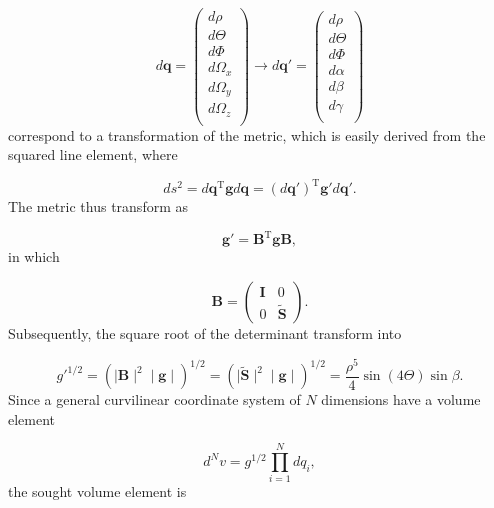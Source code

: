 \begin{equation}
d\mathbf{q} =
\begin{pmatrix}
d\rho\\
d\Theta\\
d\Phi\\
d\Omega_x\\
d\Omega_y\\
d\Omega_z\\
\end{pmatrix}
\longrightarrow
d\mathbf{q}' =
\begin{pmatrix}
d\rho\\
d\Theta\\
d\Phi\\
d\alpha\\
d\beta\\
d\gamma\\
\end{pmatrix}
\end{equation}
correspond to a transformation of the metric, which is easily derived from the squared line element, where

\begin{equation}
d s^2 = d \mathbf{q}^{\mathrm{T}}\mathbf{g}d \mathbf{q} = (d \mathbf{q}')^\mathrm{T}\mathbf{g}'d\mathbf{q}'.
\end{equation}
The metric thus transform as 

\begin{equation}
\mathbf{g}'=\mathbf{B}^{\mathrm{T}}\mathbf{g}\mathbf{B},
\end{equation}
in which

\begin{equation}
\mathbf{B} = 
\begin{pmatrix}
\mathbf{I} & 0\\
0      & \tilde{\mathbf{S}}
\end{pmatrix}.
\end{equation}
Subsequently, the square root of the determinant transform into

\begin{equation}
g'^{1/2}=(\mid\mathbf{B}\mid^2 \mid\mathbf{g}\mid)^{1/2} = (\mid\tilde{\mathbf{S}}\mid^2 \mid\mathbf{g}\mid)^{1/2}
= \frac{\rho^5}{4}\sin(4\Theta)\sin\beta.
\end{equation}
Since a general curvilinear coordinate system of $N$ dimensions have a volume element

\begin{equation}
d ^Nv = g^{1/2}\prod_{i=1}^{N} d q_i,
\end{equation}
the sought volume element is  

